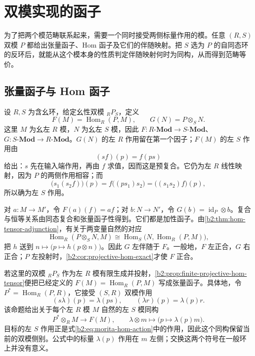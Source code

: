 
\section{双模实现的函子}
\label{b2:sec:1602}

为了把两个模范畴联系起来，需要一个同时接受两侧标量作用的模。任意 \((R,S)\) 双模 \(P\) 都给出张量函子、Hom 函子及它们的伴随映射。把 \(S\) 选为 \(P\) 的自同态环的反环后，就能从这个模本身的性质判定伴随映射何时为同构，从而得到范畴等价。

%
%

\subsection{张量函子与 Hom 函子}
\label{b2:subsec:1602:01}

设 \(R,S\) 为含幺环，给定幺性双模 \({}_RP_S\)，定义
\[
	F(M)=\operatorname{Hom}_R(P,M),\qquad G(N)=P\otimes_SN.
\]
这里 \(M\) 为幺左 \(R\) 模，\(N\) 为幺左 \(S\) 模，因此 \(F:R\text{-}\mathbf{Mod}\to S\text{-}\mathbf{Mod}\)、\(G:S\text{-}\mathbf{Mod}\to R\text{-}\mathbf{Mod}\)。\(G(N)\) 的左 \(R\) 作用留在第一个因子；\(F(M)\) 的左 \(S\) 作用由
\begin{equation}\label{b2:eq:morita-hom-action}
	(sf)(p)=f(ps)
\end{equation}
给出：\(s\) 先在输入端作用，再由 \(f\) 求值，因而这是预复合。它仍为左 \(R\) 线性映射，因为 \(P\) 的两侧作用相容；而
\[
	\bigl(s_1(s_2f)\bigr)(p)=f\bigl((ps_1)s_2\bigr) =\bigl((s_1s_2)f\bigr)(p),
\]
所以确为左 \(S\) 作用。

\ProseParagraphBreak
对 \(a:M\rightarrow M'\)，令 \(F(a)(f)=af\)；对 \(b:N\rightarrow N'\)，令 \(G(b)=\operatorname{id}_P\otimes b\)。复合与恒等关系由同态复合和张量函子性得到。它们都是加性函子。由\cref{b2:thm:hom-tensor-adjunction}，有关于两变量自然的对应
\[
	\operatorname{Hom}_R(P\otimes_SN,M) \cong\operatorname{Hom}_S\bigl(N,\operatorname{Hom}_R(P,M)\bigr),
\]
把 \(h\) 送到 \(n\mapsto\bigl(p\mapsto h(p\otimes n)\bigr)\)。因此 \(G\) 左伴随于 \(F\)。一般地，\(F\) 左正合，\(G\) 右正合；\(P\) 左投射时，\cref{b2:cor:projective-hom-exact}才使 \(F\) 正合。

\ProseParagraphBreak
若这里的双模 \({}_RP_S\) 作为左 \(R\) 模有限生成并投射，\cref{b2:prop:finite-projective-hom-tensor}便把已经定义的 \(F(M)=\operatorname{Hom}_R(P,M)\) 写成张量函子。具体地，令 \(P^*=\operatorname{Hom}_R(P,R)\)，它接受 \((S,R)\) 双模作用
\[
	(s\lambda)(p)=\lambda(ps),\qquad (\lambda r)(p)=\lambda(p)r.
\]
该命题给出关于每个左 \(R\) 模 \(M\) 自然的左 \(S\) 模同构
\[
	P^*\otimes_RM\longrightarrow F(M),\qquad \lambda\otimes m\longmapsto\bigl(p\mapsto\lambda(p)m\bigr).
\]
目标的左 \(S\) 作用正是式\eqref{b2:eq:morita-hom-action}中的作用，因此这个同构保留当前的双模侧别。公式中的标量 \(\lambda(p)\) 作用在 \(m\) 左侧；交换这两个符号在一般环上并没有意义。

